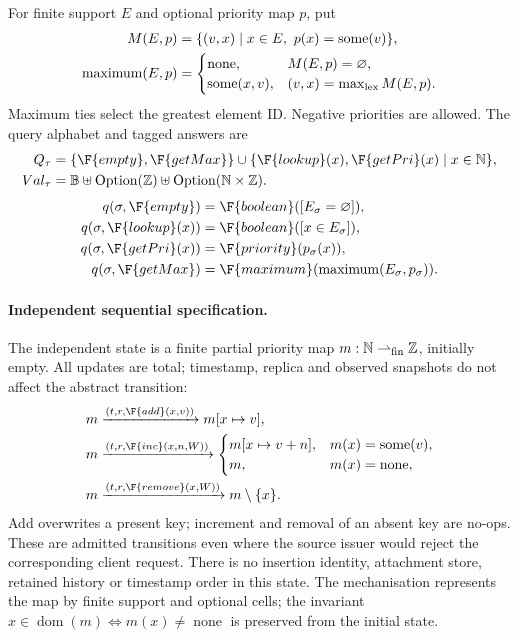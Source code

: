 For finite support $E$ and optional priority map $p$, put
\[
\begin{aligned}
M(E,p)&=\{(v,x)\mid x\in E,\ p(x)=\operatorname{some}(v)\},\\
\operatorname{maximum}(E,p)&=\begin{cases}
\operatorname{none},&M(E,p)=\varnothing,\\
\operatorname{some}(x,v),&(v,x)=\max_{\rm lex}M(E,p).
\end{cases}
\end{aligned}
\]
Maximum ties select the greatest element ID. Negative priorities are allowed.
The query alphabet and tagged answers are
\[
\begin{aligned}
Q_\tau&=\{\F{empty},\F{getMax}\}\cup
 \{\F{lookup}(x),\F{getPri}(x)\mid x\in\mathbb N\},\\
Val_\tau&=\mathbb B\uplus\operatorname{Option}(\mathbb Z)
 \uplus\operatorname{Option}(\mathbb N\times\mathbb Z).
\end{aligned}
\]
\[
\begin{aligned}
q(\sigma,\F{empty})&=\F{boolean}([E_\sigma=\varnothing]),\\
q(\sigma,\F{lookup}(x))&=\F{boolean}([x\in E_\sigma]),\\
q(\sigma,\F{getPri}(x))&=\F{priority}(p_\sigma(x)),\\
q(\sigma,\F{getMax})&=\F{maximum}(\operatorname{maximum}(E_\sigma,p_\sigma)).
\end{aligned}
\]

\paragraph{Independent sequential specification.}
The independent state is a finite partial priority map
$m:\mathbb N\rightharpoonup_{\rm fin}\mathbb Z$, initially empty. All
updates are total; timestamp, replica and observed snapshots do not affect
the abstract transition:
\[
\begin{aligned}
m&\xrightarrow{(t,r,\F{add}(x,v))}m[x\mapsto v],\\
m&\xrightarrow{(t,r,\F{inc}(x,n,W))}
 \begin{cases}m[x\mapsto v+n],&m(x)=\operatorname{some}(v),\\
 m,&m(x)=\operatorname{none},\end{cases}\\
m&\xrightarrow{(t,r,\F{remove}(x,W))}m\setminus\{x\}.
\end{aligned}
\]
Add overwrites a present key; increment and removal of an absent key are
no-ops. These are admitted transitions even where the source issuer would
reject the corresponding client request. There is no insertion identity,
attachment store, retained history or timestamp order in this state. The
mechanisation represents the map by finite support and optional cells;
the invariant $x\in\operatorname{dom}(m)\iff m(x)\ne\operatorname{none}$ is
preserved from the initial state.


